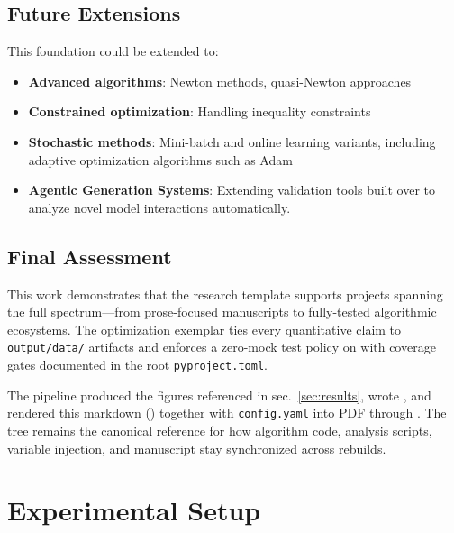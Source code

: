 \documentclass[
  english,
]{article}
\providecommand{\tightlist}{%
  \setlength{\itemsep}{0pt}\setlength{\parskip}{0pt}}
\begin{document}
\subsection{Future Extensions}\label{future-extensions}

This foundation could be extended to:

\begin{itemize}
\tightlist
\item
  \textbf{Advanced algorithms}: Newton methods, quasi-Newton approaches
\item
  \textbf{Constrained optimization}: Handling inequality constraints
\item
  \textbf{Stochastic methods}: Mini-batch and online learning variants,
  including adaptive optimization algorithms such as Adam
  \citep{kingma2014adam}
\item
  \textbf{Agentic Generation Systems}: Extending validation tools built
  over  to analyze novel model
  interactions automatically.
\end{itemize}

\subsection{Final Assessment}\label{final-assessment}

This work demonstrates that the research template supports projects
spanning the full spectrum---from prose-focused manuscripts to
fully-tested algorithmic ecosystems. The optimization exemplar ties
every quantitative claim to \texttt{output/data/} artifacts and enforces
a zero-mock test policy on
 with coverage
gates documented in the root \texttt{pyproject.toml}.

The pipeline produced the figures referenced in sec.~\ref{sec:results},
wrote , and rendered this markdown
()
together with \texttt{config.yaml} into PDF through
. The 
tree remains the canonical reference for how algorithm code, analysis
scripts, variable injection, and manuscript stay synchronized across
rebuilds.

\newpage

\section{Experimental Setup}\label{sec:experimental_setup}
\end{document}
